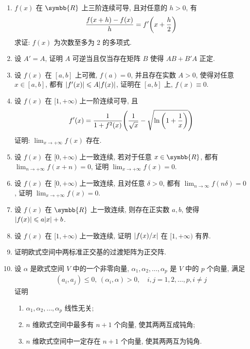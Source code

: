 \documentclass{ctexart}
\let\le\leqslant
\newcommand{\limit}[2]{\lim_{#1 \to #2}}
\newcommand{\R}{\ensuremath{\symbb{R}}}
\begin{document}
\begin{enumerate}[series=exer]
    \item $ f(x) $ 在 $ \R $ 上三阶连续可导, 且对任意的 $ h > 0 $, 有
    \begin{align*}
        \frac{f(x + h) - f(x)}{h} = f'\qty(x + \frac{h}{2})
    \end{align*}
    求证: $ f(x) $ 为次数至多为 2 的多项式.
    \item 设 $ A' = A $, 证明 $ A $ 可逆当且仅当存在矩阵 $ B $ 使得 $ AB + B'A $ 正定.
    \item 设 $ f(x) $ 在 $ [a, b] $ 上可微, $ f(a) = 0 $, 并且存在实数 $ A > 0 $, 使得对任意 $ x \in [a, b] $, 都有 $ \abs{f'(x)} \le A \abs{f(x)} $, 证明在 $ [a, b] $ 上, $ f(x) \equiv 0 $. 
    \item 设 $ f(x) $ 在 $ [1, +\infty) $ 上一阶连续可导, 且
    \begin{align*}
        f'(x) = \frac{1}{1 + f^{2}(x)}\qty(\frac{1}{\sqrt{x}} - \sqrt{\ln\qty(1 + \frac{1}{x})})
    \end{align*}
    证明: $ \limit{x}{+\infty}f(x) $ 存在.
    \item 设 $ f(x) $ 在 $ [0, +\infty) $ 上一致连续, 若对于任意 $ x \in \R $, 都有 $ \limit{n}{+\infty} f(x + n) = 0 $, 证明 $ \limit{x}{+\infty} f(x) = 0 $.  
    \item 设 $ f(x) $ 在 $ [0, +\infty) $ 上一致连续, 且对任意 $ \delta > 0 $, 都有 $ \limit{n}{\infty} f(n\delta) = 0 $, 证明 $ \limit{x}{+\infty} f(x) = 0 $.  
    \item 设 $ f(x) $ 在 $ \R $ 上一致连续, 则存在正实数 $ a, b $, 使得 $ \abs{f(x)} \le a\abs{x} + b $. 
    \item 设 $ f(x) $ 在 $ [1, +\infty) $ 上一致连续, 证明 $ \abs{f(x)/x} $ 在 $ [1, +\infty) $ 有界. 
    \item 证明欧式空间中两标准正交基的过渡矩阵为正交阵.
    \item 设 $ \alpha $ 是欧式空间 $ V $ 中的一个非零向量, $ \alpha_{1}, \alpha_{2}, \dots, \alpha_{p} $ 是 $ V $ 中的 $ p $ 个向量, 满足
    \begin{align*}
        (a_{i}, a_{j}) \le 0,\ (\alpha_{i}, \alpha) > 0, \quad i, j = 1, 2, \dots, p, i \ne j
    \end{align*}
    证明
    \begin{enumerate}
        \item $ \alpha_{1}, \alpha_{2}, \dots, \alpha_{p} $ 线性无关;
        \item $ n $ 维欧式空间中最多有 $ n + 1 $ 个向量, 使其两两互成钝角;
        \item $ n $ 维欧式空间中一定存在 $ n + 1 $ 个向量, 使其两两互为钝角.

\end{enumerate}
\end{enumerate}
\end{document}
